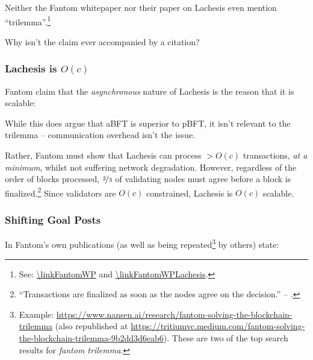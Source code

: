 Neither the Fantom whitepaper nor their paper on Lachesis even mention ``trilemma''.\footnote{
    See: \url{\linkFantomWP} and \url{\linkFantomWPLachesis}.
}

Why isn't the claim ever accompanied by a citation?



\subsubsection{Lachesis is $O(c)$}

Fantom claim that the \emph{asynchronous} nature of Lachesis is the reason that it is scalable:


While this does argue that aBFT is superior to pBFT, it isn't relevant to the trilemma -- communication overhead isn't the issue.

Rather, Fantom must show that Lachesis can process $> O(c)$ transactions, \emph{at a minimum}, whilst not suffering network degradation.
However, regardless of the order of blocks processed, $\nicefrac{2}{3}$ of validating nodes must agree before a block is finalized.\footnote{
    ``Transactions are finalized as soon as the nodes agree on the decision.'' -- \citeFantomLachesis.
}
Since validators are $O(c)$ constrained, Lachesis is $O(c)$ scalable.


\subsubsection{Shifting Goal Posts}

In Fantom's own publications (as well as being repeated\footnote{
    Example: \url{https://www.nansen.ai/research/fantom-solving-the-blockchain-trilemma} (also republished at \url{https://tritiumvc.medium.com/fantom-solving-the-blockchain-trilemma-9b2dd3d6eab6}).
    These are two of the top search results for \emph{fantom trilemma}.
} by others) state:


